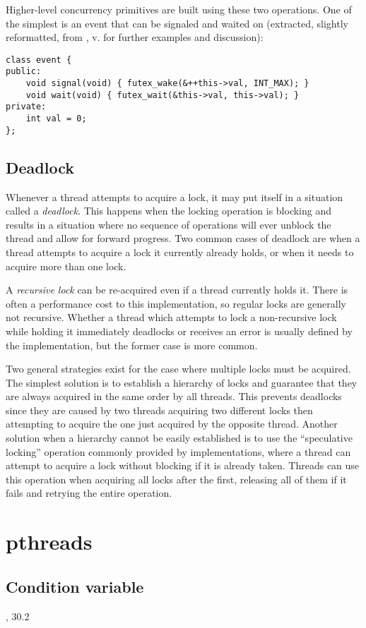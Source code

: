 Higher-level concurrency primitives are built using these two operations.  One
of the simplest is an event that can be signaled and waited on (extracted,
slightly reformatted, from \cite{Drepper2011}, v. for further examples and
discussion):

\begin{lstlisting}[style=c++]
class event {
public:
    void signal(void) { futex_wake(&++this->val, INT_MAX); }
    void wait(void) { futex_wait(&this->val, this->val); }
private:
    int val = 0;
};
\end{lstlisting}

\subsection{Deadlock}

Whenever a thread attempts to acquire a lock, it may put itself in a situation
called a \textit{deadlock}.  This happens when the locking operation is blocking
and results in a situation where no sequence of operations will ever unblock the
thread and allow for forward progress.  Two common cases of deadlock are when a
thread attempts to acquire a lock it currently already holds, or when it needs
to acquire more than one lock.

A \textit{recursive lock} can be re-acquired even if a thread currently holds
it.  There is often a performance cost to this implementation, so regular locks
are generally not recursive.  Whether a thread which attempts to lock a
non-recursive lock while holding it immediately deadlocks or receives an error
is usually defined by the implementation, but the former case is more common.

Two general strategies exist for the case where multiple locks must be acquired.
The simplest solution is to establish a hierarchy of locks and guarantee that
they are always acquired in the same order by all threads.  This prevents
deadlocks since they are caused by two threads acquiring two different locks
then attempting to acquire the one just acquired by the opposite thread.
Another solution when a hierarchy cannot be easily established is to use the
``speculative locking'' operation commonly provided by implementations, where a
thread can attempt to acquire a lock without blocking if it is already taken.
Threads can use this operation when acquiring all locks after the first,
releasing all of them if it fails and retrying the entire operation.

\section{pthreads}

\subsection{Condition variable}

\cite{Kerrisk2010}, 30.2
